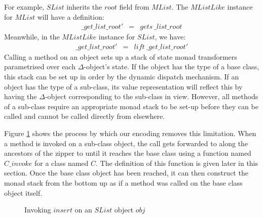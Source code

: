 \documentclass[authoryear,preprint]{sigplanconf}
\begin{document}
For example, $\mathit{SList}$ inherits the $\mathit{root}$ field from $\mathit{MList}$. The $\mathit{MListLike}$ instance for $\mathit{MList}$ will have a definition:
\begin{displaymath}
\begin{array}{lcl}
\mathit{\_get\_list\_root'} & = & \mathit{gets}~\mathit{\_list\_root}
\end{array}
\end{displaymath}
Meanwhile, in the $\mathit{MListLike}$ instance for $\mathit{SList}$, we have:
\begin{displaymath}
\begin{array}{lcl}
\mathit{\_get\_list\_root'} & = & \mathit{lift}~\mathit{\_get\_list\_root'}
\end{array}
\end{displaymath}
Calling a method on an object sets up a stack of state monad transformers parametrised over each $\Delta$-object's state. If the object has the type of a base class, this stack can be set up in order by the dynamic dispatch mechanism. If an object has the type of a sub-class, its value representation will reflect this by having the $\Delta$-object corresponding to the sub-class in view. However, all methods of a sub-class require an appropriate monad stack to be set-up before they can be called and cannot be called directly from elsewhere.

Figure \ref{fig:subinvoke} shows the process by which our encoding removes this limitation. When a method is invoked on a sub-class object, the call gets forwarded to along the ancestors of the zipper to until it reaches the base class using a function named $C\_\mathit{invoke}$ for a class named $C$. The definition of this function is given later in this section. Once the base class object has been reached, it can then construct the monad stack from the bottom up as if a method was called on the base class object itself.

\begin{figure}
    \begin{center}
    \end{center}
    \caption{Invoking $\mathit{insert}$ on an $\mathit{SList}$ object $\mathit{obj}$} \label{fig:subinvoke}
\end{figure}
\end{document}

